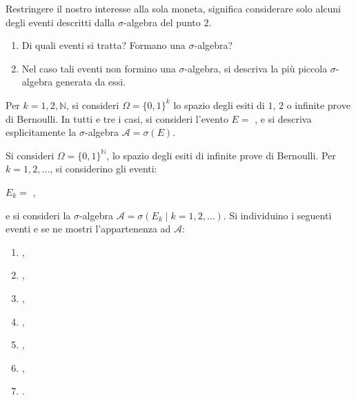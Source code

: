 Restringere il nostro interesse alla sola moneta, significa considerare solo alcuni degli eventi descritti dalla $\sigma $-algebra del punto $2$.
\begin{enumerate}[resume]
	\item Di quali eventi si tratta? Formano una $\sigma $-algebra?
	\item Nel caso tali eventi non formino una $\sigma $-algebra, si descriva la più piccola $\sigma $-algebra generata da essi.
\end{enumerate}

\Esercizio{}

Per $k=1,2,\mathbb{N}$, si consideri $\Omega =\{0,1\}^{k}$ lo spazio degli esiti di $1$, $2$ o infinite prove di Bernoulli. In tutti e tre i casi, si consideri l'evento $E=$ , e si descriva esplicitamente la $\sigma$-algebra $\mathcal{A} =\sigma (E)$.

\Esercizio{}

Si consideri $\Omega =\{0,1\}^{\mathbb{N}}$, lo spazio degli esiti di infinite prove di Bernoulli. Per $k=1,2,\dots $, si considerino gli eventi:
\begin{center}
	$E_{k}=$ ,
\end{center}
e si consideri la $\sigma $-algebra $\mathcal{A} =\sigma (E_{k} \mid k=1,2,\dots)$. Si individuino i seguenti eventi e se ne mostri l'appartenenza ad $\mathcal{A}$:
\begin{enumerate}
	\item {},
	\item {},
	\item {},
	\item {},
	\item {},
	\item {},
	\item {}.
\end{enumerate}

\Esercizio{}

